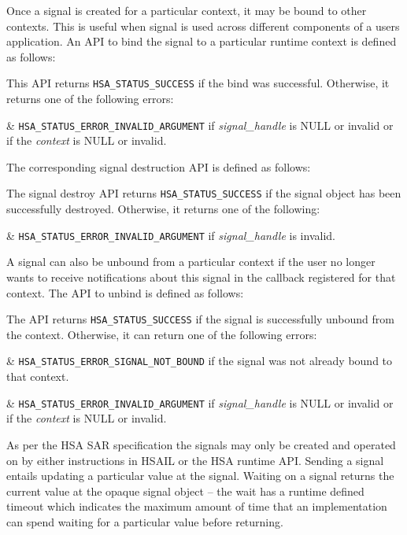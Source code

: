 \documentclass{book}
\begin{document}
Once a signal is created for a particular context, it may be bound
to other contexts. This is useful when signal is used across
different components of a users application. An API to bind the
signal to a particular runtime context is defined as follows:



This API returns \texttt{HSA\_STATUS\_SUCCESS} if the bind was
successful. Otherwise, it returns one of the following errors:

\begin{easylist}
& \texttt{HSA\_STATUS\_ERROR\_INVALID\_ARGUMENT} if {\itshape
signal\_handle} is NULL or invalid or if the {\itshape context} is
NULL or invalid.
\end{easylist}

The corresponding signal destruction API is defined as follows:


The signal destroy API returns \texttt{HSA\_STATUS\_SUCCESS} if the
signal object has been successfully destroyed. Otherwise, it returns
one of the following:

\begin{easylist}
& \texttt{HSA\_STATUS\_ERROR\_INVALID\_ARGUMENT} if {\itshape
signal\_handle} is invalid.
\end{easylist}

A signal can also be unbound from a particular context if the user
no longer wants to receive notifications about this signal in the
callback registered for that context. The API to unbind is defined
as follows:



The API returns \texttt{HSA\_STATUS\_SUCCESS} if the signal is
successfully unbound from the context. Otherwise, it can return one
of the following errors:

\begin{easylist}
& \texttt{HSA\_STATUS\_ERROR\_SIGNAL\_NOT\_BOUND} if the signal was
not already bound to that context.

& \texttt{HSA\_STATUS\_ERROR\_INVALID\_ARGUMENT} if {\itshape
signal\_handle} is NULL or invalid or if the {\itshape context} is
NULL or invalid.
\end{easylist}

As per the HSA SAR specification the signals may only be created and
operated on by either instructions in HSAIL or the HSA runtime API.
Sending a signal entails updating a particular value at the signal.
Waiting on a signal returns the current value at the opaque signal
object -- the wait has a runtime defined timeout which indicates the
maximum amount of time that an implementation can spend waiting for
a particular value before returning.
\end{document}
